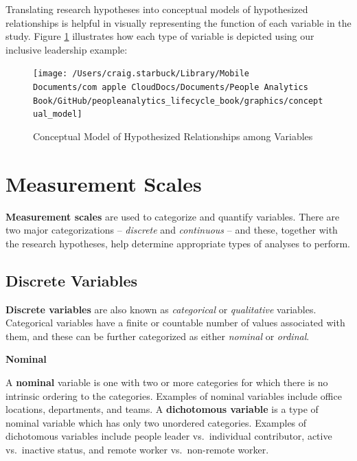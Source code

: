 \documentclass[
]{book}
\begin{document}
Translating research hypotheses into conceptual models of hypothesized relationships is helpful in visually representing the function of each variable in the study. Figure \ref{fig:concept-mdl} illustrates how each type of variable is depicted using our inclusive leadership example:

\begin{figure}

{\centering \texttt{[image: /Users/craig.starbuck/Library/Mobile Documents/com~apple~CloudDocs/Documents/People Analytics Book/GitHub/peopleanalytics\_lifecycle\_book/graphics/conceptual\_model]} 

}

\caption{Conceptual Model of Hypothesized Relationships among Variables}\label{fig:concept-mdl}
\end{figure}

\hypertarget{measurement-scales}{%
\section{Measurement Scales}\label{measurement-scales}}

\textbf{Measurement scales} are used to categorize and quantify variables. There are two major categorizations -- \emph{discrete} and \emph{continuous} -- and these, together with the research hypotheses, help determine appropriate types of analyses to perform.

\hypertarget{discrete-variables}{%
\subsection{Discrete Variables}\label{discrete-variables}}

\textbf{Discrete variables} are also known as \emph{categorical} or \emph{qualitative} variables. Categorical variables have a finite or countable number of values associated with them, and these can be further categorized as either \emph{nominal} or \emph{ordinal}.

\textbf{Nominal}

A \textbf{nominal} variable is one with two or more categories for which there is no intrinsic ordering to the categories. Examples of nominal variables include office locations, departments, and teams. A \textbf{dichotomous variable} is a type of nominal variable which has only two unordered categories. Examples of dichotomous variables include people leader vs.~individual contributor, active vs.~inactive status, and remote worker vs.~non-remote worker.
\end{document}

